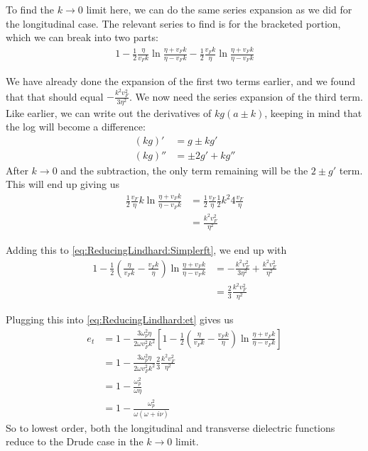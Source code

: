 \documentclass[../../main.tex]{subfiles}
\newcommand{\vf}{v_F}
\begin{document}
To find the $k \rightarrow 0$ limit here, we can do the same series expansion as we did for the longitudinal case. The relevant series to find is for the bracketed portion, which we can break into two parts:
\begin{align} \label{eq:ReducingLindhard:Simplerft}
	 1 - \frac12 \frac{\eta}{\vf k}\ln\frac{\eta + \vf k}{\eta - \vf k} - \frac12 \frac{\vf k}{\eta}\ln\frac{\eta + \vf k}{\eta - \vf k}
\end{align}

We have already done the expansion of the first two terms earlier, and we found that that should equal $- \frac{k^2 \vf^2}{3 \eta^2}$. We now need the series expansion of the third term. Like earlier, we can write out the derivatives of $k g(a \pm k)$, keeping in mind that the log will become a difference:
\begin{align}
	(k g)' &= g \pm k g' \\
	(k g)'' &= \pm 2 g' + k g''
\end{align}
After $k \rightarrow 0$ and the subtraction, the only term remaining will be the $2 \pm g'$ term. This will end up giving us
\begin{align}
	\frac12 \frac{\vf }{\eta} k \ln\frac{\eta + \vf k}{\eta - \vf k} &= \frac12 \frac{\vf}{\eta} \frac12 k^2 4  \frac{\vf}{\eta} \\
	&= \frac{k^2 \vf^2}{\eta^2} 
\end{align}

Adding this to \eqref{eq:ReducingLindhard:Simplerft}, we end up with 
\begin{align}
	1 - \frac12 \left(\frac{\eta}{\vf k} - \frac{\vf k}{\eta} \right)\ln\frac{\eta + \vf k}{\eta - \vf k} &= - \frac{k^2 \vf^2}{3 \eta^2} + \frac{k^2 \vf^2}{\eta^2} \\
	&= \frac23 \frac{k^2 \vf^2}{\eta^2}
\end{align}

Plugging this into \eqref{eq:ReducingLindhard:et} gives us
\begin{align}
	e_t &= 1 - \frac{3 \omega_p^2 \eta}{2\omega \vf^2 k^2} \left[ 1 - \frac12 \left(\frac{\eta}{\vf k} - \frac{\vf k}{\eta} \right)\ln\frac{\eta + \vf k}{\eta - \vf k} \right] \\
	&= 1 - \frac{3 \omega_p^2 \eta}{2\omega \vf^2 k^2} \frac23 \frac{k^2 \vf^2}{\eta^2} \\
	&= 1 - \frac{\omega_p^2}{\omega \eta}\\
	&= 1 - \frac{\omega_p^2}{\omega \left(\omega + i \nu \right) }
\end{align}
So to lowest order, both the longitudinal and transverse dielectric functions reduce to the Drude case in the $k \rightarrow 0$ limit.
\end{document}
